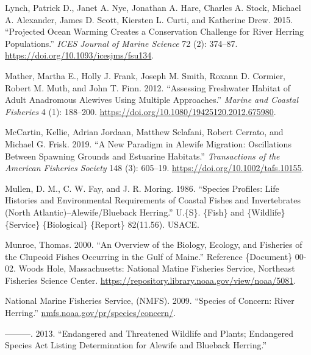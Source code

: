 \documentclass[
]{book}
\newlength{\cslhangindent}
\newlength{\cslentryspacingunit} %
\newenvironment{CSLReferences}[2] %
 {%
  \setlength{\parindent}{0pt}
  \ifodd #1
  \let\oldpar\par
  \def\par{\hangindent=\cslhangindent\oldpar}
  \fi
  \setlength{\parskip}{#2\cslentryspacingunit}
 }%
 {}
\begin{document}
\begin{CSLReferences}{1}{0}
\leavevmode{}%
Lynch, Patrick D., Janet A. Nye, Jonathan A. Hare, Charles A. Stock, Michael A. Alexander, James D. Scott, Kiersten L. Curti, and Katherine Drew. 2015. {``Projected Ocean Warming Creates a Conservation Challenge for River Herring Populations.''} \emph{ICES Journal of Marine Science} 72 (2): 374--87. \url{https://doi.org/10.1093/icesjms/fsu134}.

\leavevmode{}%
Mather, Martha E., Holly J. Frank, Joseph M. Smith, Roxann D. Cormier, Robert M. Muth, and John T. Finn. 2012. {``Assessing {Freshwater} {Habitat} of {Adult} {Anadromous} {Alewives} {Using} {Multiple} {Approaches}.''} \emph{Marine and Coastal Fisheries} 4 (1): 188--200. \url{https://doi.org/10.1080/19425120.2012.675980}.

\leavevmode{}%
McCartin, Kellie, Adrian Jordaan, Matthew Sclafani, Robert Cerrato, and Michael G. Frisk. 2019. {``A {New} {Paradigm} in {Alewife} {Migration}: {Oscillations} Between {Spawning} {Grounds} and {Estuarine} {Habitats}.''} \emph{Transactions of the American Fisheries Society} 148 (3): 605--19. \url{https://doi.org/10.1002/tafs.10155}.

\leavevmode{}%
Mullen, D. M., C. W. Fay, and J. R. Moring. 1986. {``Species Profiles: Life Histories and Environmental Requirements of Coastal Fishes and Invertebrates ({North} {Atlantic})--Alewife/Blueback Herring.''} U.\{S\}. \{Fish\} and \{Wildlife\} \{Service\} \{Biological\} \{Report\} 82(11.56). USACE.

\leavevmode{}%
Munroe, Thomas. 2000. {``An Overview of the Biology, Ecology, and Fisheries of the Clupeoid Fishes Occurring in the {Gulf} of {Maine}.''} Reference \{Document\} 00-02. Woods Hole, Massachusetts: National Matine Fisheries Service, Northeast Fisheries Science Center. \url{https://repository.library.noaa.gov/view/noaa/5081}.

\leavevmode{}%
National Marine Fisheries Service, (NMFS). 2009. {``Species of Concern: River Herring.''} \href{https://nmfs.noaa.gov/pr/species/concern/}{nmfs.noaa.gov/pr/species/concern/}.

\leavevmode{}%
---------. 2013. {``Endangered and Threatened Wildlife and Plants; Endangered Species Act Listing Determination for Alewife and Blueback Herring.''}


\end{CSLReferences}
\end{document}
